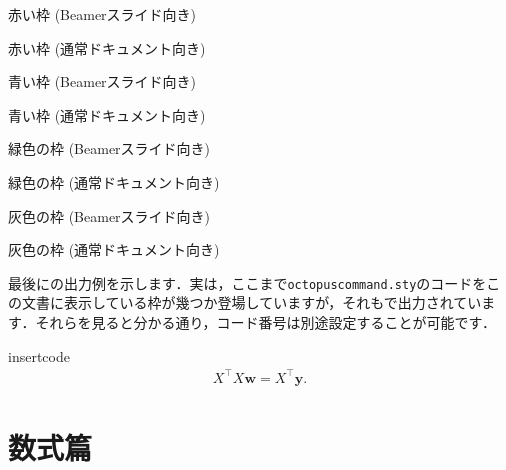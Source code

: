 \documentclass[uplatex]{jsreport}
\begin{document}
\begin{octpframered1}[title={octpframered1}]
  赤い枠 (Beamerスライド向き)
\end{octpframered1}
\begin{octpframered2}[title={octpframered2}]
  赤い枠 (通常ドキュメント向き)
\end{octpframered2}
\begin{octpframeblue1}[title={octpframeblue1}]
  青い枠 (Beamerスライド向き)
\end{octpframeblue1}
\begin{octpframeblue2}[title={octpframeblue2}]
  青い枠 (通常ドキュメント向き)
\end{octpframeblue2}
\begin{octpframegreen1}[title={octpframegreen1}]
  緑色の枠 (Beamerスライド向き)
\end{octpframegreen1}
\begin{octpframegreen2}[title={octpframegreen2}]
  緑色の枠 (通常ドキュメント向き)
\end{octpframegreen2}
\begin{octpframegray1}[title={octpframegray1}]
  灰色の枠 (Beamerスライド向き)
\end{octpframegray1}
\begin{octpframegray2}[title={octpframegray2}]
  灰色の枠 (通常ドキュメント向き)
\end{octpframegray2}
\par
最後にの出力例を示します．実は，ここまで\texttt{octopuscommand.sty}のコードをこの文書に表示している枠が幾つか登場していますが，それもで出力されています．それらを見ると分かる通り，コード番号は別途設定することが可能です．
\begin{insertcode}{insertcode}
\begin{align*}
  X^{\top}X \bm{w} = X^{\top} \bm{y}.
\end{align*}
\end{insertcode}

\chapter{数式篇}
\end{document}
